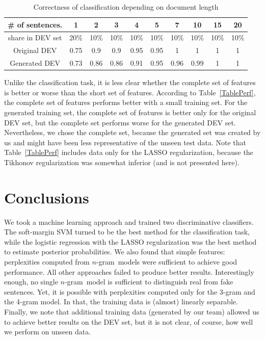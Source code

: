 \documentclass[11pt]{article}
\newcommand{\ngram}{\mbox{$n$-gram }}
\begin{document}
\begin{table}\centering
\caption{Correctness of classification depending on document length\label{TableCorr}}
\begin{tabular}{c|c|c|c|c|c|c|c|c|c}
\# of sentences.  &  1   &  2   &   3   &  4   &   5   &    7  & 10   & 15   &  20  \\\hline
share in DEV set  & 20\% & 10\% &  10\% & 10\% &  10\% &  10\% & 10\% & 10\% & 10\%  \\\hline\hline
Original DEV      & 0.75 & 0.9  &  0.9  & 0.95 & 0.95  &    1  &   1  &   1  &  1 \\\hline
Generated DEV     & 0.73 & 0.86 &  0.86 & 0.91 & 0.95  &   0.96&  0.99 &  1  &  1 \\\hline
\end{tabular}
\end{table}

Unlike the classification task, it is less clear whether the complete set of features is better or worse
than the short set of features.
According to Table~\ref{TablePerf}, the complete set of features performs better with a small training set.
For the generated training set, the complete set of features is better only for the original DEV set,
but the complete set performs worse for the generated DEV set.
Nevertheless, we chose the complete set,
because the generated set was created by us and might have been less representative of the unseen test data.
Note that Table~\ref{TablePerf} includes data only for the LASSO
regularization, because the Tikhonov regularization was somewhat inferior (and is not presented here).

\section{Conclusions}
We took a machine learning approach and trained two discriminative classifiers.
The soft-margin SVM turned to be the best method for the classification task,
while the logistic regression with the LASSO regularization was
the best method to estimate posterior probabilities.
We also found that simple features: perplexities computed from \ngram models were sufficient to achieve good performance.
All other approaches failed to produce better results.
Interestingly enough, no single \ngram model is sufficient to distinguish real from fake sentences.
Yet, it is possible with perplexities computed only for the 3-gram and the 4-gram model. In that,
the training data is (almost) linearly separable.
Finally, we note that additional training data (generated by our team) allowed us to achieve better
results on the DEV set, but it is not clear, of course, how well we perform on unseen data.



\end{document}
